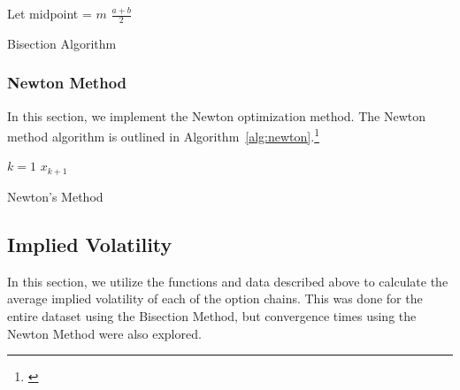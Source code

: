 \documentclass[10pt]{article}
\begin{document}
        \begin{algorithm}[h]
            \SetAlgoNoLine
            Let midpoint = $m$\;
            \Return $\frac{a + b}{2}$\;
            \caption{Bisection Algorithm}
            \label{alg:bisection}
        \end{algorithm}

        
        
        \subsubsection{Newton Method}
        
        In this section, we implement the Newton optimization method. The Newton method algorithm is outlined in Algorithm~\ref{alg:newton}.\footnote{\cite{Stefanica2011}}
        
        \begin{algorithm}[h]
            \SetAlgoNoLine
            $k = 1$\;
            \Return $x_{k+1}$\;
            \caption{Newton's Method}
            \label{alg:newton}
        \end{algorithm}


    \subsection{Implied Volatility}

    In this section, we utilize the functions and data described above to calculate the average implied volatility of each of the option chains. This was done for the entire dataset using the Bisection Method, but convergence times using the Newton Method were also explored.
\end{document}
